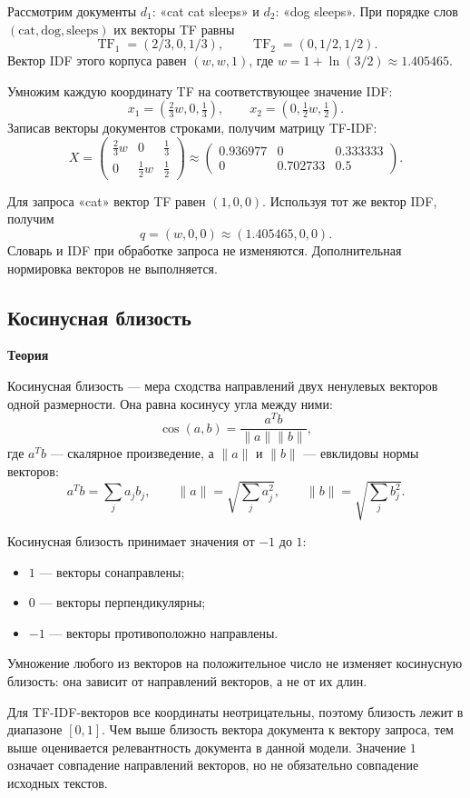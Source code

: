 \documentclass[12pt,a4paper]{article}
\newcommand{\micro}[1]{\subsection{#1}}
\newcommand{\taskhead}[1]{\par\textbf{#1}\par}
\begin{document}
Рассмотрим документы $d_1$: «cat cat sleeps»
и $d_2$: «dog sleeps». При порядке слов
$(\text{cat},\text{dog},\text{sleeps})$ их векторы TF равны
\[
\operatorname{TF}_1=(2/3,0,1/3),\qquad
\operatorname{TF}_2=(0,1/2,1/2).
\]
Вектор IDF этого корпуса равен $(w,w,1)$,
где $w=1+\ln(3/2)\approx1.405465$.

Умножим каждую координату TF на соответствующее значение IDF:
\[
x_1=(\tfrac23w,0,\tfrac13),\qquad
x_2=(0,\tfrac12w,\tfrac12).
\]
Записав векторы документов строками, получим матрицу TF-IDF:
\[
X=
\begin{pmatrix}
\frac23w & 0 & \frac13\\
0 & \frac12w & \frac12
\end{pmatrix}
\approx
\begin{pmatrix}
0.936977 & 0 & 0.333333\\
0 & 0.702733 & 0.5
\end{pmatrix}.
\]

Для запроса «cat» вектор TF равен $(1,0,0)$.
Используя тот же вектор IDF, получим
\[
q=(w,0,0)\approx(1.405465,0,0).
\]
Словарь и IDF при обработке запроса не изменяются.
Дополнительная нормировка векторов не выполняется.


\micro{Косинусная близость}

\taskhead{Теория}

Косинусная близость --- мера сходства направлений двух
ненулевых векторов одной размерности. Она равна косинусу
угла между ними:
\[
\operatorname{cos}(a,b)=\frac{a^Tb}{\|a\|\|b\|},
\]
где $a^Tb$ --- скалярное произведение, а $\|a\|$ и $\|b\|$
--- евклидовы нормы векторов:
\[
a^Tb=\sum_j a_jb_j,\qquad
\|a\|=\sqrt{\sum_j a_j^2},\qquad
\|b\|=\sqrt{\sum_j b_j^2}.
\]

Косинусная близость принимает значения от $-1$ до $1$:
\begin{itemize}
  \item $1$ --- векторы сонаправлены;
  \item $0$ --- векторы перпендикулярны;
  \item $-1$ --- векторы противоположно направлены.
\end{itemize}
Умножение любого из векторов на положительное число
не изменяет косинусную близость: она зависит
от направлений векторов, а не от их длин.

Для TF-IDF-векторов все координаты неотрицательны,
поэтому близость лежит в диапазоне $[0,1]$.
Чем выше близость вектора документа к вектору запроса,
тем выше оценивается релевантность документа в данной модели.
Значение $1$ означает совпадение направлений векторов,
но не обязательно совпадение исходных текстов.
\end{document}
